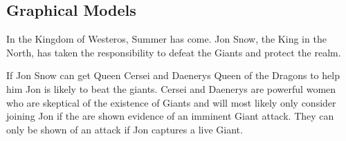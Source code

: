 \documentclass[11pt,addpoints,answers]{exam}
\newcommand{\emptycircle}{{\LARGE $\fullmoon$}\ \ }
\newcommand{\filledcircle}{{\LARGE $\newmoon$}\ \ }
\begin{document}
\begin{questions}
\end{questions}

\clearpage

\subsection{Graphical Models}

In the Kingdom of Westeros, Summer has come. Jon Snow, the King in the North, has taken the responsibility to defeat the Giants and protect the realm.

If Jon Snow can get Queen Cersei and Daenerys Queen of the Dragons to help him Jon is likely to beat the giants. Cersei and Daenerys are powerful women who are skeptical of the existence of Giants and will most likely only consider joining Jon if the are shown evidence of an imminent Giant attack. They can only be shown of an attack if Jon captures a live Giant.
\end{document}
